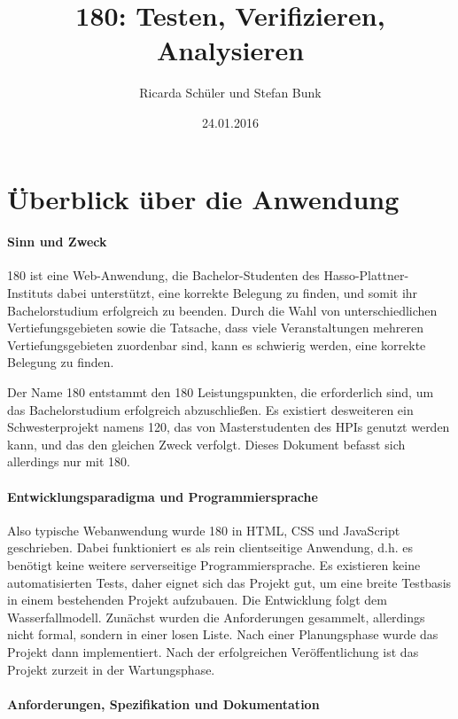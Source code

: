 \documentclass[ngerman]{article}
\title{180: Testen, Verifizieren, Analysieren}
\author{Ricarda Schüler und Stefan Bunk}
\date{24.01.2016}
\begin{document}
\maketitle
\tableofcontents


\section{Überblick über die Anwendung}
\label{sec:ueberblick}

\paragraph{Sinn und Zweck}

180 ist eine Web-Anwendung, die Bachelor-Studenten des Hasso-Plattner-Instituts dabei unterstützt, eine korrekte Belegung zu finden, und somit ihr Bachelorstudium erfolgreich zu beenden.
Durch die Wahl von unterschiedlichen Vertiefungsgebieten sowie die Tatsache, dass viele Veranstaltungen mehreren Vertiefungsgebieten zuordenbar sind, kann es schwierig werden, eine korrekte Belegung zu finden.

Der Name 180 entstammt den 180 Leistungspunkten, die erforderlich sind, um das Bachelorstudium erfolgreich abzuschließen.
Es existiert desweiteren ein Schwesterprojekt namens 120, das von Masterstudenten des HPIs genutzt werden kann, und das den gleichen Zweck verfolgt.
Dieses Dokument befasst sich allerdings nur mit 180.

\paragraph{Entwicklungsparadigma und Programmiersprache}

Also typische Webanwendung wurde 180 in HTML, CSS und JavaScript geschrieben.
Dabei funktioniert es als rein clientseitige Anwendung, d.h. es benötigt keine weitere serverseitige Programmiersprache.
Es existieren keine automatisierten Tests, daher eignet sich das Projekt gut, um eine breite Testbasis in einem bestehenden Projekt aufzubauen.
Die Entwicklung folgt dem Wasserfallmodell.
Zunächst wurden die Anforderungen gesammelt, allerdings nicht formal, sondern in einer losen Liste.
Nach einer Planungsphase wurde das Projekt dann implementiert.
Nach der erfolgreichen Veröffentlichung ist das Projekt zurzeit in der Wartungsphase.

\paragraph{Anforderungen, Spezifikation und Dokumentation}
\end{document}
